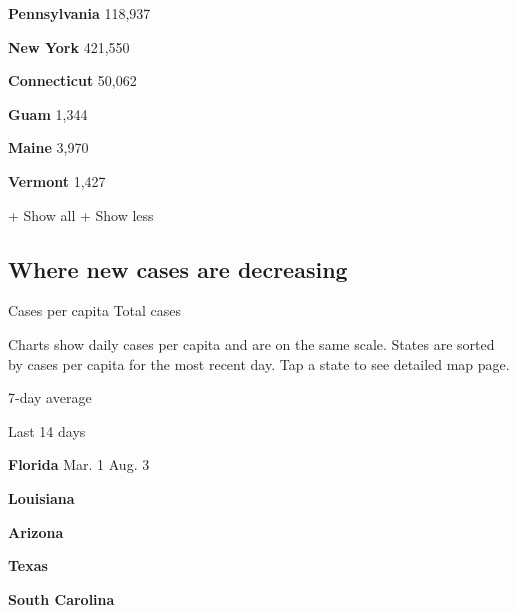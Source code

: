 \textbf{Pennsylvania} 118,937

\href{https://www.nytimes.com/interactive/2020/us/new-york-coronavirus-cases.html}{}

\textbf{New York} 421,550

\href{https://www.nytimes.com/interactive/2020/us/connecticut-coronavirus-cases.html}{}

\textbf{Connecticut} 50,062

\textbf{Guam} 1,344

\href{https://www.nytimes.com/interactive/2020/us/maine-coronavirus-cases.html}{}

\textbf{Maine} 3,970

\href{https://www.nytimes.com/interactive/2020/us/vermont-coronavirus-cases.html}{}

\textbf{Vermont} 1,427

+ Show all + Show less

\hypertarget{where-new-cases-are-decreasing}{%
\subsection{Where new cases are
decreasing}\label{where-new-cases-are-decreasing}}

Cases per capita Total cases

Charts show daily cases per capita and are on the same scale. States are
sorted by cases per capita for the most recent day. Tap a state to see
detailed map page.

\href{https://www.nytimes.com/interactive/2020/us/florida-coronavirus-cases.html}{}

7-day average

Last 14 days

\textbf{Florida} Mar. 1 Aug. 3

\href{https://www.nytimes.com/interactive/2020/us/louisiana-coronavirus-cases.html}{}

\textbf{Louisiana}

\href{https://www.nytimes.com/interactive/2020/us/arizona-coronavirus-cases.html}{}

\textbf{Arizona}

\href{https://www.nytimes.com/interactive/2020/us/texas-coronavirus-cases.html}{}

\textbf{Texas}

\href{https://www.nytimes.com/interactive/2020/us/south-carolina-coronavirus-cases.html}{}

\textbf{South Carolina}

